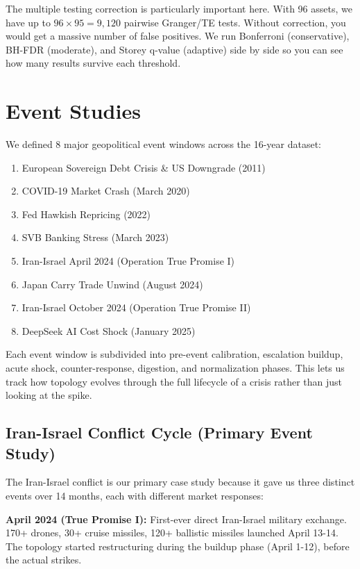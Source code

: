 \documentclass[12pt, letterpaper]{article}
\begin{document}
The multiple testing correction is particularly important here. With 96 assets, we have up to $96 \times 95 = 9{,}120$ pairwise Granger/TE tests. Without correction, you would get a massive number of false positives. We run Bonferroni (conservative), BH-FDR (moderate), and Storey q-value (adaptive) side by side so you can see how many results survive each threshold.

\section{Event Studies}

We defined 8 major geopolitical event windows across the 16-year dataset:

\begin{enumerate}
    \item European Sovereign Debt Crisis \& US Downgrade (2011)
    \item COVID-19 Market Crash (March 2020)
    \item Fed Hawkish Repricing (2022)
    \item SVB Banking Stress (March 2023)
    \item Iran-Israel April 2024 (Operation True Promise I)
    \item Japan Carry Trade Unwind (August 2024)
    \item Iran-Israel October 2024 (Operation True Promise II)
    \item DeepSeek AI Cost Shock (January 2025)
\end{enumerate}

Each event window is subdivided into pre-event calibration, escalation buildup, acute shock, counter-response, digestion, and normalization phases. This lets us track how topology evolves through the full lifecycle of a crisis rather than just looking at the spike.

\subsection{Iran-Israel Conflict Cycle (Primary Event Study)}

The Iran-Israel conflict is our primary case study because it gave us three distinct events over 14 months, each with different market responses:

\textbf{April 2024 (True Promise I):} First-ever direct Iran-Israel military exchange. 170+ drones, 30+ cruise missiles, 120+ ballistic missiles launched April 13-14. The topology started restructuring during the buildup phase (April 1-12), before the actual strikes.
\end{document}
